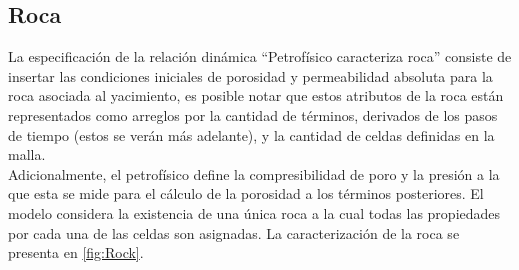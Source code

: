 

\subsection{Roca}\label{sec:PS_Rock}

La especificación de la relación dinámica ``Petrofísico caracteriza roca'' consiste de insertar las condiciones iniciales de porosidad y permeabilidad absoluta para la roca asociada al yacimiento, es posible notar que estos atributos de la roca están representados como arreglos por la cantidad de términos, derivados de los pasos de tiempo (estos se verán más adelante), y la cantidad de celdas definidas en la malla. \\
Adicionalmente, el petrofísico define la compresibilidad de poro y la presión a la que esta se mide para el cálculo de la porosidad a los términos posteriores. El modelo considera la existencia de una única roca a la cual todas las propiedades por cada una de las celdas son asignadas. La caracterización de la roca se presenta en \ref{fig:Rock}.\\

